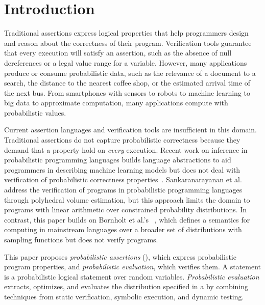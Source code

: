 \section{Introduction}
Traditional assertions express logical properties that help programmers design and
reason about the correctness of their program. Verification tools
guarantee that every execution will satisfy an assertion, such as the
absence of null dereferences or a legal value range for a variable.
However, many applications produce or consume probabilistic data, such as the
relevance of a document to a search, the distance to the nearest
coffee shop,
or the estimated arrival time of the next bus. From smartphones with
sensors to robots to machine learning to big data to approximate
computation, many applications compute with probabilistic
values.  %

Current assertion languages and verification tools are insufficient in
this domain.  Traditional assertions do not capture probabilistic
correctness because they demand that a property hold on \emph{every}
execution.  Recent work on inference in probabilistic programming
languages builds language abstractions to aid programmers in describing
machine learning models but
does not deal with verification of probabilistic correctness
properties~\cite{infernet, church, pmonad, PPT:05}. Sankaranarayanan et al.~\cite{sriram-pldi} address the
verification of programs in probabilistic programming
languages through polyhedral volume estimation,
but this approach limits the domain to programs with linear arithmetic
over constrained probability distributions.
In contrast, this paper
builds on Bornholt et al.'s ~\cite{uncertaint},
which defines a semantics for computing in mainstream languages over a broader set of distributions
with sampling functions
but does not verify programs.

This paper proposes \emph{probabilistic assertions}
(\passerts), which express probabilistic program properties, and
\emph{probabilistic evaluation}, which verifies them.  A \passert
statement is a probabilistic logical statement over random
variables. \emph{Probabilistic evaluation} extracts, optimizes, and
evaluates the distribution specified in a \passert by
combining techniques from static verification,
symbolic execution, and dynamic testing.

